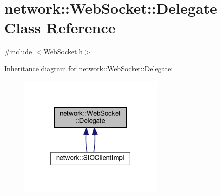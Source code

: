 \hypertarget{classnetwork_1_1WebSocket_1_1Delegate}{}\section{network\+:\+:Web\+Socket\+:\+:Delegate Class Reference}
\label{classnetwork_1_1WebSocket_1_1Delegate}


{\ttfamily \#include $<$Web\+Socket.\+h$>$}



Inheritance diagram for network\+:\+:Web\+Socket\+:\+:Delegate\+:
\nopagebreak
\begin{figure}[H]
\begin{center}
\leavevmode
\includegraphics[width=199pt]{classnetwork_1_1WebSocket_1_1Delegate__inherit__graph}
\end{center}
\end{figure}
